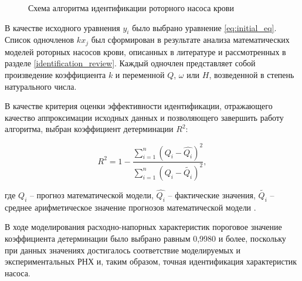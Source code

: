 \begin{figure}[!ht]
\caption{Схема алгоритма идентификации роторного насоса крови} 
\label{img:flowchart}  
\end{figure}


В качестве исходного уравнения $y_i$ было выбрано уравнение \eqref{eq:initial_eq}. Список одночленов $kx_j$ был сформирован в результате анализа математических моделей роторных насосов крови, описанных в литературе и рассмотренных в разделе \ref{identification_review}. Каждый одночлен представляет собой произведение коэффициента $k$ и переменной $Q$, $\omega$ или $H$, возведенной в степень натурального числа.

В качестве критерия оценки эффективности идентификации, отражающего качество аппроксимации исходных данных и позволяющего завершить работу алгоритма, выбран коэффициент детерминации $R^2$:

\begin{equation}
	\label{eq:r_squared}
		R^2 = 1- \frac{{\sum\limits_{i=1}^n} (Q_i - \hat{Q_i})^2}{{\sum\limits_{i=1}^n} (Q_i - \tilde{Q_i})^2}, %
\end{equation}

\noindent где $Q_i$ -- прогноз математической модели, $\hat{Q_i}$ -- фактические значения, $\tilde{Q_i}$ -- среднее арифметическое значение прогнозов математической модели \cite{draper2014applied}. 

В ходе моделирования расходно-напорных характеристик пороговое значение коэффициента детерминации было выбрано равным 0,9980 и более, поскольку при данных значениях достигалось соответствие моделируемых и экспериментальных РНХ и, таким образом, точная идентификация характеристик насоса.

